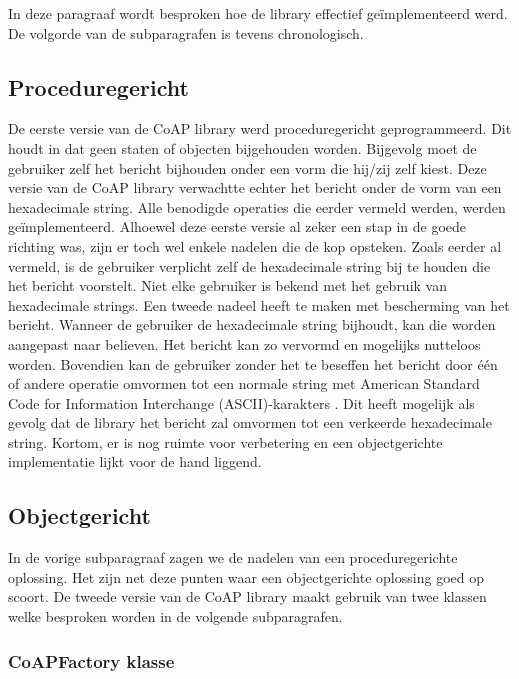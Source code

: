 In deze paragraaf wordt besproken hoe de library effectief ge\"{i}mplementeerd werd. De volgorde van de subparagrafen is tevens chronologisch. 

\subsection{Proceduregericht}

De eerste versie van de CoAP library werd proceduregericht geprogrammeerd. Dit houdt in dat geen staten of objecten bijgehouden worden. Bijgevolg moet de gebruiker zelf het bericht bijhouden onder een vorm die hij/zij zelf kiest. Deze versie van de CoAP library verwachtte echter het bericht onder de vorm van een hexadecimale string. Alle benodigde operaties die eerder vermeld werden, werden ge\"{i}mplementeerd. Alhoewel deze eerste versie al zeker een stap in de goede richting was, zijn er toch wel enkele nadelen die de kop opsteken. Zoals eerder al vermeld, is de gebruiker verplicht zelf de hexadecimale string bij te houden die het bericht voorstelt. Niet elke gebruiker is bekend met het gebruik van hexadecimale strings. Een tweede nadeel heeft te maken met bescherming van het bericht. Wanneer de gebruiker de hexadecimale string bijhoudt, kan die worden aangepast naar believen. Het bericht kan zo vervormd en mogelijks nutteloos worden. Bovendien kan de gebruiker zonder het te beseffen het bericht door \'{e}\'{e}n of andere operatie omvormen tot een normale string met American Standard Code for Information Interchange (ASCII)-karakters . Dit heeft mogelijk als gevolg dat de library het bericht zal omvormen tot een verkeerde hexadecimale string. Kortom, er is nog ruimte voor verbetering en een objectgerichte implementatie lijkt voor de hand liggend.

\subsection{Objectgericht}

In de vorige subparagraaf zagen we de nadelen van een proceduregerichte oplossing. Het zijn net deze punten waar een objectgerichte oplossing goed op scoort. De tweede versie van de CoAP library maakt gebruik van twee klassen welke besproken worden in de volgende subparagrafen.

\subsubsection{CoAPFactory klasse}

